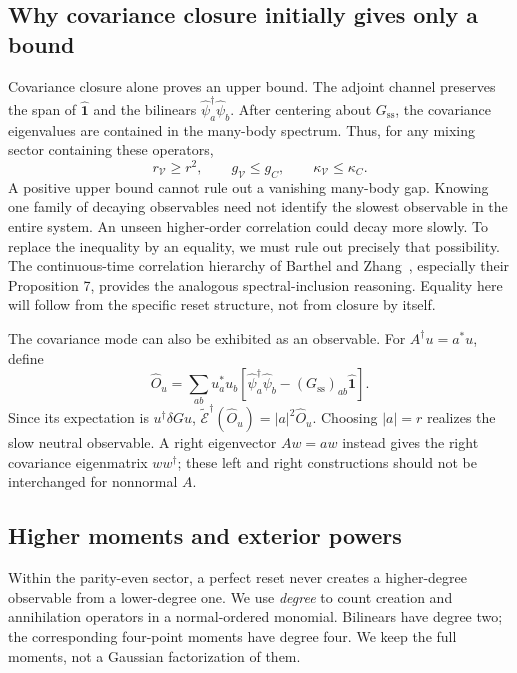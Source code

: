 \documentclass[aps,prb,onecolumn,nofootinbib,superscriptaddress,floatfix]{revtex4-2}
\newcommand{\Id}{\hat{\mathbf 1}}
\newcommand{\E}{\widetilde{\mathcal E}}
\newcommand{\steady}{\mathrm{ss}}
\begin{document}
\subsection{Why covariance closure initially gives only a bound}
Covariance closure alone proves an upper bound. The adjoint channel
preserves the span of $\Id$ and the bilinears
$\hat\psi_a^\dagger\hat\psi_b$. After centering about $G_\steady$,
the covariance eigenvalues are contained in the many-body spectrum.
Thus, for any mixing sector containing these operators,
\begin{equation}
 r_{\mathcal V}\ge r^2,\qquad
 g_{\mathcal V}\le g_C,\qquad
 \kappa_{\mathcal V}\le\kappa_C. \label{eq:bound}
\end{equation}
A positive upper bound cannot rule out a vanishing many-body gap.
Knowing one family of decaying observables need not identify the
slowest observable in the entire system. An unseen higher-order
correlation could decay more slowly. To replace the inequality
by an equality, we must rule out precisely that possibility.
The continuous-time correlation hierarchy of Barthel and
Zhang~\cite{BZ}, especially their Proposition 7, provides the analogous
spectral-inclusion reasoning. Equality here will follow from the
specific reset structure, not from closure by itself.

The covariance mode can also be exhibited as an observable.
For $A^\dagger u=a^*u$, define
\begin{equation}
 \hat O_u=\sum_{ab}u_a^*u_b
   \left[\hat\psi_a^\dagger\hat\psi_b-(G_\steady)_{ab}\Id\right].
 \label{eq:observable}
\end{equation}
Since its expectation is $u^\dagger\delta Gu$,
$\E^\dagger(\hat O_u)=|a|^2\hat O_u$.
Choosing $|a|=r$ realizes the slow neutral observable. A right
eigenvector $Aw=aw$ instead gives the right covariance eigenmatrix
$ww^\dagger$; these left and right constructions should not be
interchanged for nonnormal $A$.

\subsection{Higher moments and exterior powers}
Within the parity-even sector, a perfect reset never creates
a higher-degree observable from a lower-degree one. We use
\emph{degree} to count creation and annihilation operators in a
normal-ordered monomial. Bilinears have degree two; the corresponding
four-point moments have degree four. We keep the full moments,
not a Gaussian factorization of them.
\end{document}
